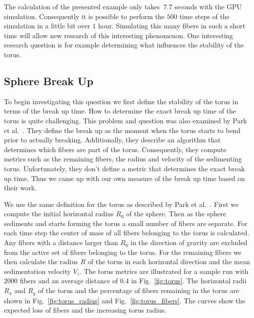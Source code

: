 The calculation of the presented example only takes $~7.7$ seconds with the GPU simulation. Consequently it is possible to perform the $500$ time steps of the simulation in a little bit over $1$ hour. Simulating this many fibers in such a short time will allow new research of this interesting phenomenon. One interesting research question is for example determining what influences the stability of the torus.

\subsection{Sphere Break Up}
To begin investigating this question we first define the stability of the torus in terms of the break up time. How to determine the exact break up time of the torus is quite challenging. This problem and question was also examined by Park et al.~\cite{Park2010}. They define the break up as the moment when the torus starts to bend prior to actually breaking. Additionally, they describe an algorithm that determines which fibers are part of the torus. Consequently, they compute metrics such as the remaining fibers, the radius and velocity of the sedimenting torus. Unfortunately, they don't define a metric that determines the exact break up time. Thus we came up with our own measure of the break up time based on their work.

We use the same definition for the torus as described by Park et al.~\cite{Park2010}. First we compute the initial horizontal radius $R_0$ of the sphere. Then as the sphere sediments and starts forming the torus a small number of fibers are separate. For each time step the center of mass of all fibers belonging to the torus is calculated. Any fibers with a distance larger than $R_0$ in the direction of gravity are excluded from the active set of fibers belonging to the torus. For the remaining fibers we then calculate the radius $R$ of the torus in each horizontal direction and the mean sedimentation velocity $V_z$. The torus metrics are illustrated for a sample run with $2000$ fibers and an average distance of $0.4$ in Fig.~\ref{fig:torus}. The horizontal radii $R_x$ and $R_y$ of the torus and the percentage of fibers remaining in the torus are shown in Fig.~\ref{fig:torus_radius} and Fig.~\ref{fig:torus_fibers}. The curves show the expected loss of fibers and the increasing torus radius.

